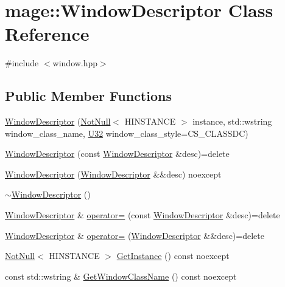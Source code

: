 \hypertarget{classmage_1_1_window_descriptor}{}\section{mage\+:\+:Window\+Descriptor Class Reference}
\label{classmage_1_1_window_descriptor}


{\ttfamily \#include $<$window.\+hpp$>$}

\subsection*{Public Member Functions}
\begin{DoxyCompactItemize}
\item 
\mbox{\hyperlink{classmage_1_1_window_descriptor_a3c0f82aaea1ac634e0001e2bdf1484ab}{Window\+Descriptor}} (\mbox{\hyperlink{namespacemage_a8769f9d670d6b585ea306cb1062af94b}{Not\+Null}}$<$ H\+I\+N\+S\+T\+A\+N\+CE $>$ instance, std\+::wstring window\+\_\+class\+\_\+name, \mbox{\hyperlink{namespacemage_a41c104c036fba3756a74e19f793eeaa1}{U32}} window\+\_\+class\+\_\+style=C\+S\+\_\+\+C\+L\+A\+S\+S\+DC)
\item 
\mbox{\hyperlink{classmage_1_1_window_descriptor_a98059ff14fd8c0e808d1a15dbf9b6bb8}{Window\+Descriptor}} (const \mbox{\hyperlink{classmage_1_1_window_descriptor}{Window\+Descriptor}} \&desc)=delete
\item 
\mbox{\hyperlink{classmage_1_1_window_descriptor_a9c63bbf4c794efd0e6dbc067d3378ccd}{Window\+Descriptor}} (\mbox{\hyperlink{classmage_1_1_window_descriptor}{Window\+Descriptor}} \&\&desc) noexcept
\item 
\mbox{\hyperlink{classmage_1_1_window_descriptor_ac73160dd1e90b9acf819164b774d5709}{$\sim$\+Window\+Descriptor}} ()
\item 
\mbox{\hyperlink{classmage_1_1_window_descriptor}{Window\+Descriptor}} \& \mbox{\hyperlink{classmage_1_1_window_descriptor_a539433423c905e8b45d5bc9d895ee79c}{operator=}} (const \mbox{\hyperlink{classmage_1_1_window_descriptor}{Window\+Descriptor}} \&desc)=delete
\item 
\mbox{\hyperlink{classmage_1_1_window_descriptor}{Window\+Descriptor}} \& \mbox{\hyperlink{classmage_1_1_window_descriptor_a314e45a7cac3a68caefd8b05ddc86040}{operator=}} (\mbox{\hyperlink{classmage_1_1_window_descriptor}{Window\+Descriptor}} \&\&desc)=delete
\item 
\mbox{\hyperlink{namespacemage_a8769f9d670d6b585ea306cb1062af94b}{Not\+Null}}$<$ H\+I\+N\+S\+T\+A\+N\+CE $>$ \mbox{\hyperlink{classmage_1_1_window_descriptor_a09423845e3cc6bd451e280a92222ca14}{Get\+Instance}} () const noexcept
\item 
const std\+::wstring \& \mbox{\hyperlink{classmage_1_1_window_descriptor_aeb9db711e495a075146d322978de593e}{Get\+Window\+Class\+Name}} () const noexcept
\end{DoxyCompactItemize}
